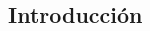 \documentclass[a4paper,10pt]{article}
\begin{document}
\subsection{Introducción}



\normalsize

% 
	
\onecolumn
\begin{thebibliography}{11}
	
	
\end{thebibliography}	
	
	
\end{document}
